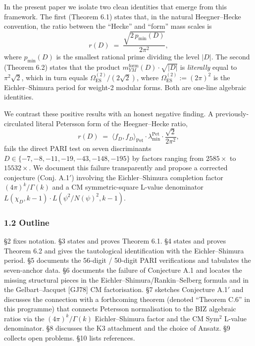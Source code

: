 \documentclass[
  11pt,
  a4paper,
]{amsart}
\begin{document}
In the present paper we isolate two clean identities that emerge from this framework. The first (Theorem 6.1) states that, in the natural Heegner--Hecke convention, the ratio between the ``Hecke'' and ``form'' mass scales is
\[
r(D) \;=\; \frac{\sqrt{2\,p_{\min}(D)}}{2\pi^{2}},
\]
where \(p_{\min}(D)\) is the smallest rational prime dividing the level \(|D|\). The second (Theorem 6.2) states that the product \(m_{YM}^{\mathrm{form}}(D)\cdot\sqrt{|D|}\) is \emph{literally} equal to \(\pi^{2}\sqrt{2}\), which in turn equals \(\Omega_{\mathrm{ES}}^{(2)}/(2\sqrt{2})\), where \(\Omega_{\mathrm{ES}}^{(2)} := (2\pi)^{2}\) is the Eichler--Shimura period for weight-2 modular forms. Both are one-line algebraic identities.

We contrast these positive results with an honest negative finding. A previously-circulated literal Petersson form of the Heegner--Hecke ratio,
\[
r(D) \;=\; \langle f_D, f_D\rangle_{\mathrm{Pet}} \cdot \lambda_{\min}^{\mathrm{Pet}} \cdot \frac{\sqrt 2}{2\pi^{2}}, \tag{Conj.\ A.1}
\]
fails the direct PARI test on seven discriminants \(D \in \{-7,-8,-11,-19,-43,-148,-195\}\) by factors ranging from \(2585\times\) to \(15532\times\). We document this failure transparently and propose a corrected conjecture (Conj. A.1\('\)) involving the Eichler--Shimura completion factor \((4\pi)^{k}/\Gamma(k)\) and a CM symmetric-square L-value denominator \(L(\chi_D, k-1)\cdot L(\psi^{2}/N(\psi)^{2}, k-1)\).

\hypertarget{outline}{%
\subsubsection{1.2 Outline}\label{outline}}

§2 fixes notation. §3 states and proves Theorem 6.1. §4 states and proves Theorem 6.2 and gives the tautological identification with the Eichler--Shimura period. §5 documents the 56-digit / 50-digit PARI verifications and tabulates the seven-anchor data. §6 documents the failure of Conjecture A.1 and locates the missing structural pieces in the Eichler--Shimura/Rankin--Selberg formula and in the Gelbart--Jacquet {[}GJ78{]} CM factorisation. §7 sketches Conjecture A.1\('\) and discusses the connection with a forthcoming theorem (denoted ``Theorem C.6'' in this programme) that connects Petersson normalisation to the BIZ algebraic ratios via the \((4\pi)^{k}/\Gamma(k)\) Eichler--Shimura factor and the CM Sym\(^{2}\) L-value denominator. §8 discusses the K3 attachment and the choice of Ansatz. §9 collects open problems. §10 lists references.
\end{document}
